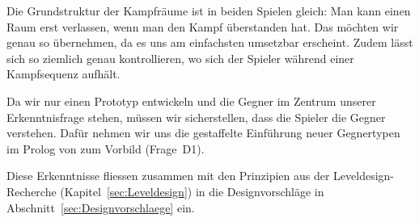 \documentclass[../Main.tex]{subfiles}
\begin{document}
Die Grundstruktur der Kampfräume ist in beiden Spielen gleich: Man kann einen Raum erst verlassen, wenn man den Kampf überstanden hat. Das möchten wir genau so übernehmen, da es uns am einfachsten umsetzbar erscheint. Zudem lässt sich so ziemlich genau kontrollieren, wo sich der Spieler während einer Kampfsequenz aufhält.

Da wir nur einen Prototyp entwickeln und die Gegner im Zentrum unserer Erkenntnisfrage stehen, müssen wir sicherstellen, dass die Spieler die Gegner verstehen. Dafür nehmen wir uns die gestaffelte Einführung neuer Gegnertypen im Prolog von  zum Vorbild (Frage~D1).

Diese Erkenntnisse fliessen zusammen mit den Prinzipien aus der Leveldesign-Recherche (Kapitel~\ref{sec:Leveldesign}) in die Designvorschläge in Abschnitt~\ref{sec:Designvorschlaege} ein.
\end{document}
